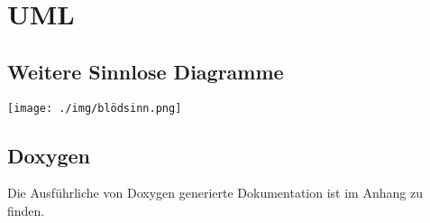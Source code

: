 \chapter{UML}

\section{Weitere Sinnlose Diagramme}
\begin{minipage}{\linewidth}
\centering%
\texttt{[image: ./img/blödsinn.png]}%
%
\label{fig:blödsinn}%
\end{minipage}
\vspace{10px}

\section{Doxygen}

Die Ausführliche von Doxygen generierte Dokumentation ist im Anhang zu finden.



